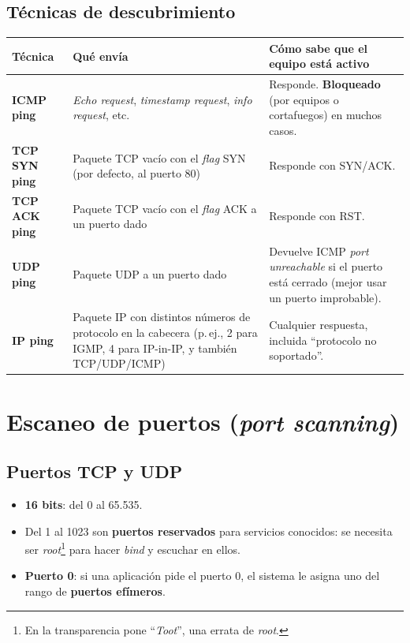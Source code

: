 \documentclass[11pt,a4paper]{report}
\begin{document}
\subsection{Técnicas de descubrimiento}
 
\begin{center}
\small
{\setlength{\aboverulesep}{0pt}\setlength{\belowrulesep}{0pt}\renewcommand{\arraystretch}{1.3}%
\begin{tabularx}{\linewidth}{>{\raggedright\arraybackslash}p{2.4cm} !{\color{gray!45}\vrule width 0.2pt} >{\raggedright\arraybackslash}X !{\color{gray!45}\vrule width 0.2pt} >{\raggedright\arraybackslash}X}
\toprule
\textbf{Técnica} & \textbf{Qué envía} & \textbf{Cómo sabe que el equipo está activo} \\
\midrule
\textbf{ICMP ping} & \emph{Echo request}, \emph{timestamp request}, \emph{info request}, etc. & Responde. \textbf{Bloqueado} (por equipos o cortafuegos) en muchos casos. \\
\textbf{TCP SYN ping} & Paquete TCP vacío con el \emph{flag} SYN (por defecto, al puerto 80) & Responde con SYN/ACK. \\
\textbf{TCP ACK ping} & Paquete TCP vacío con el \emph{flag} ACK a un puerto dado & Responde con RST. \\
\textbf{UDP ping} & Paquete UDP a un puerto dado & Devuelve ICMP \emph{port unreachable} si el puerto está cerrado (mejor usar un puerto improbable). \\
\textbf{IP ping} & Paquete IP con distintos números de protocolo en la cabecera (p.\,ej., 2 para IGMP, 4 para IP-in-IP, y también TCP/UDP/ICMP) & Cualquier respuesta, incluida ``protocolo no soportado''. \\
\bottomrule
\end{tabularx}}
\end{center}
 
\section{Escaneo de puertos (\emph{port scanning})}
 
\subsection{Puertos TCP y UDP}
 
\begin{itemize}
  \item \textbf{16 bits}: del 0 al 65.535.
  \item Del 1 al 1023 son \textbf{puertos reservados} para servicios conocidos: se necesita ser \emph{root}\footnote{En la transparencia pone ``\emph{Toot}'', una errata de \emph{root}.} para hacer \emph{bind} y escuchar en ellos.
  \item \textbf{Puerto 0}: si una aplicación pide el puerto 0, el sistema le asigna uno del rango de \textbf{puertos efímeros}.
\end{itemize}
 
\end{document}
